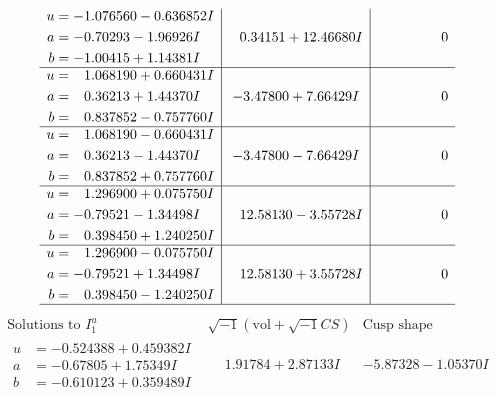 \documentclass[1p]{elsarticle_modified}
\theoremstyle{definition}
\newcommand{\I}{\sqrt{-1}}
\begin{document}
$$\begin{array}{c|c|c}
\begin{aligned}
u &= -1.076560 - 0.636852 I \\
a &= -0.70293 - 1.96926 I \\
b &= -1.00415 + 1.14381 I\end{aligned}
 & \phantom{-}0.34151 + 12.46680 I & \phantom{-0.000000 } 0 \\ \hline\begin{aligned}
u &= \phantom{-}1.068190 + 0.660431 I \\
a &= \phantom{-}0.36213 + 1.44370 I \\
b &= \phantom{-}0.837852 - 0.757760 I\end{aligned}
 & -3.47800 + 7.66429 I & \phantom{-0.000000 } 0 \\ \hline\begin{aligned}
u &= \phantom{-}1.068190 - 0.660431 I \\
a &= \phantom{-}0.36213 - 1.44370 I \\
b &= \phantom{-}0.837852 + 0.757760 I\end{aligned}
 & -3.47800 - 7.66429 I & \phantom{-0.000000 } 0 \\ \hline\begin{aligned}
u &= \phantom{-}1.296900 + 0.075750 I \\
a &= -0.79521 - 1.34498 I \\
b &= \phantom{-}0.398450 + 1.240250 I\end{aligned}
 & \phantom{-}12.58130 - 3.55728 I & \phantom{-0.000000 } 0 \\ \hline\begin{aligned}
u &= \phantom{-}1.296900 - 0.075750 I \\
a &= -0.79521 + 1.34498 I \\
b &= \phantom{-}0.398450 - 1.240250 I\end{aligned}
 & \phantom{-}12.58130 + 3.55728 I & \phantom{-0.000000 } 0\\
 \hline 
 \end{array}$$\newpage$$\begin{array}{c|c|c}  
\text{Solutions to }I^u_{1}& \I (\text{vol} + \sqrt{-1}CS) & \text{Cusp shape}\\
 \hline 
\begin{aligned}
u &= -0.524388 + 0.459382 I \\
a &= -0.67805 + 1.75349 I \\
b &= -0.610123 + 0.359489 I\end{aligned}
 & \phantom{-}1.91784 + 2.87133 I & -5.87328 - 1.05370 I \\ \hline\begin{aligned}

\end{aligned}
\end{array}$$
\end{document}
